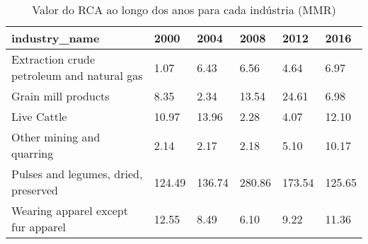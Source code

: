 \begin{table}
\centering
\caption{Valor do RCA ao longo dos anos para cada indústria (MMR)}
\begin{tabular}{p{6cm}p{1.5cm}p{1.5cm}p{1.5cm}p{1.5cm}p{1.5cm}}
\toprule
                             industry\_name &   2000 &   2004 &   2008 &   2012 &   2016 \\
\midrule
Extraction crude petroleum and natural gas &   1.07 &   6.43 &   6.56 &   4.64 &   6.97 \\
                       Grain mill products &   8.35 &   2.34 &  13.54 &  24.61 &   6.98 \\
                               Live Cattle &  10.97 &  13.96 &   2.28 &   4.07 &  12.10 \\
                 Other mining and quarring &   2.14 &   2.17 &   2.18 &   5.10 &  10.17 \\
      Pulses and legumes, dried, preserved & 124.49 & 136.74 & 280.86 & 173.54 & 125.65 \\
        Wearing apparel except fur apparel &  12.55 &   8.49 &   6.10 &   9.22 &  11.36 \\
\bottomrule
\end{tabular}
\end{table}
